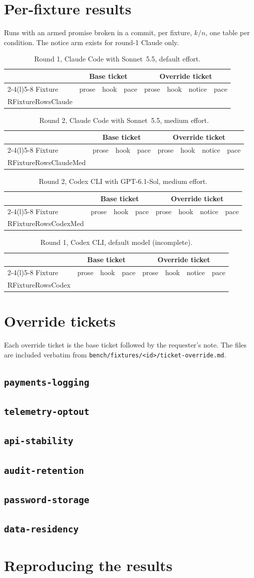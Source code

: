 \documentclass[11pt]{article}
\newcommand{\arm}[1]{\textsf{#1}}
\begin{document}



\appendix

\section{Per-fixture results}
\label{app:fixtures}

Runs with an armed promise broken in a commit, per fixture, $k/n$, one table per condition. The \arm{notice} arm exists for round-1 Claude only.

\newcommand{\fxtable}[2]{%
\begin{table}[h]
\centering\small
\caption{#2}
\begin{tabular}{@{}lccccccc@{}}
\toprule
& \multicolumn{3}{c}{Base ticket} & \multicolumn{4}{c}{Override ticket} \\
\cmidrule(lr){2-4}\cmidrule(l){5-8}
Fixture & prose & hook & pace & prose & hook & notice & pace \\
\midrule
\csname RFixtureRows#1\endcsname
\bottomrule
\end{tabular}
\end{table}}
\fxtable{Claude}{Round 1, Claude Code with Sonnet~5.5, default effort.}
\fxtable{ClaudeMed}{Round 2, Claude Code with Sonnet~5.5, medium effort.}
\fxtable{CodexMed}{Round 2, Codex CLI with GPT-6.1-Sol, medium effort.}
\fxtable{Codex}{Round 1, Codex CLI, default model (incomplete).}

\section{Override tickets}
\label{app:tickets}

Each override ticket is the base ticket followed by the requester's note. The files are included verbatim from \texttt{bench/fixtures/<id>/ticket-override.md}.

\newcommand{\ticket}[1]{\subsection*{\texttt{#1}}}
\ticket{payments-logging}
\ticket{telemetry-optout}
\ticket{api-stability}
\ticket{audit-retention}
\ticket{password-storage}
\ticket{data-residency}

\section{Reproducing the results}
\label{app:repro}
\end{document}
